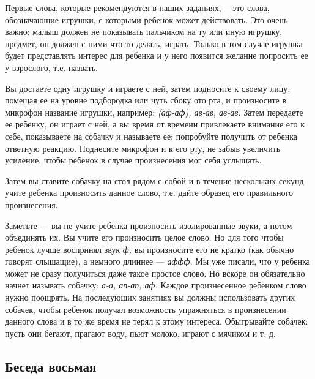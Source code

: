 \documentclass[a5paper]{book}
\renewcommand{\emph}[1]{\textit{#1}}
\begin{document}
Первые слова, которые рекомендуются в наших заданиях,--- это слова,
обозначающие игрушки, с которыми ребенок может действовать. Это очень
важно: малыш должен не показывать пальчиком на ту или иную игрушку,
предмет, он должен с ними что-то делать, играть. Только в том случае
игрушка будет представлять интерес для ребенка и у него появится желание
попросить ее у взрослого, т.е. назвать.

Вы достаете одну игрушку и играете с ней, затем подносите к своему лицу,
помещая ее на уровне подбородка или чуть сбоку ото рта, и произносите в
микрофон название игрушки, например: \emph{(аф-аф), ав-ав, ав-ав.} Затем
передаете ее ребенку, он играет с ней, а вы время от времени привлекаете
внимание его к себе, показываете на собачку и называете ее; попробуйте
получить от ребенка ответную реакцию. Поднесите микрофон и к его рту, не
забыв увеличить усиление, чтобы ребенок в случае произнесения мог себя
услышать.

Затем вы ставите собачку на стол рядом с собой и в течение нескольких
секунд учите ребенка произносить данное слово, т.е. дайте образец его
правильного произнесения.

Заметьте --- вы не учите ребенка произносить изолированные звуки, а
потом объединять их. Вы учите его произносить целое слово. Но для того
чтобы ребенок лучше воспринял звук \emph{ф,} вы произносите его не
кратко (как обычно говорят слышащие), а немного длиннее --- \emph{аффф.}
Мы уже писали, что у ребенка может не сразу получиться даже такое
простое слово. Но вскоре он обязательно начнет называть собачку:
\emph{а-а, ап-ап, аф.} Каждое произнесенное ребенком слово нужно
поощрять. На последующих занятиях вы должны использовать других собачек,
чтобы ребенок получал возможность упражняться в произнесении данного
слова и в то же время не терял к этому интереса. Обыгрывайте собачек:
пусть они бегают, прагают воду, пьют молоко, играют с мячиком и т. д.

\subsection*{Беседа восьмая}
\end{document}
